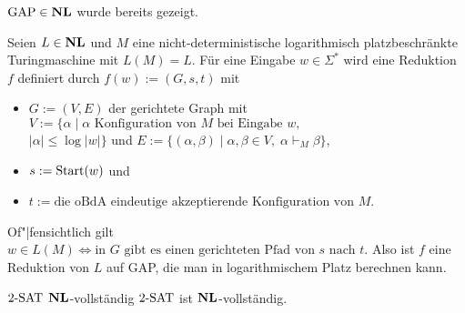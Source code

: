\begin{Beweis}
    $\text{GAP} \in \mathbf{NL}$ wurde bereits gezeigt.

    Seien $L \in \mathbf{NL}$ und $M$ eine nicht-deterministische logarithmisch platzbeschränkte
    Turingmaschine mit $L(M) = L$.
    Für eine Eingabe $w \in \Sigma^\ast$ wird eine Reduktion $f$ definiert durch
    $f(w) := (G, s, t)$ mit
    \begin{itemize}
        \item
        $G := (V, E)$ der gerichtete Graph mit
        $V := \{\alpha \;|\; \alpha \text{ Konfiguration von } M \text{ bei Eingabe } w,$\\
        $|\alpha| \le \log |w|\}$ und
        $E := \{(\alpha, \beta) \;|\; \alpha, \beta \in V,\; \alpha \vdash_M \beta\}$,

        \item
        $s := \text{Start}(w)$ und

        \item
        $t := \text{die oBdA eindeutige akzeptierende Konfiguration von } M$.
    \end{itemize}
    Of"|fensichtlich gilt $w \in L(M) \iff \text{in } G \text{ gibt es einen gerichteten Pfad von }
    s \text{ nach } t$.
    Also ist $f$ eine Reduktion von $L$ auf GAP, die man in logarithmischem Platz berechnen kann.
\end{Beweis}

\linie
\pagebreak

\begin{Satz}{$2\text{-SAT}$ $\mathbf{NL}$-vollständig}
    $2\text{-SAT}$ ist $\mathbf{NL}$-vollständig.
\end{Satz}

